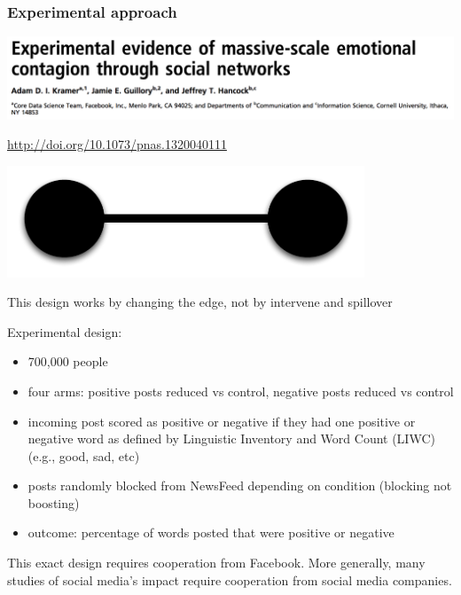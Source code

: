 \documentclass[aspectratio=169]{beamer}
\begin{document}
\begin{frame}
\frametitle{Experimental approach}

\begin{center}
\includegraphics[width=\textwidth]{figures/kramer_experimental_2014_title}
\end{center}

\vfill
\url{http://doi.org/10.1073/pnas.1320040111}

\end{frame}
\begin{frame}

\begin{center}
\includegraphics[width=0.8\textwidth]{figures/dyad}
\end{center}

This design works by changing the edge, not by intervene and spillover

\end{frame}
\begin{frame}

Experimental design:
\begin{itemize}
\item 700,000 people
\pause
\item four arms: positive posts reduced vs control, negative posts reduced vs control 
\pause
\item incoming post scored as positive or negative if they had one positive or negative word as defined by Linguistic Inventory and Word Count (LIWC) (e.g., good, sad, etc)
\pause
\item posts randomly blocked from NewsFeed depending on condition (blocking not boosting) 
\pause
\item outcome: percentage of words posted that were positive or negative
\end{itemize}

\vfill
This exact design requires cooperation from Facebook. More generally, many studies of social media's impact require cooperation from social media companies.

\end{frame}
\end{document}
